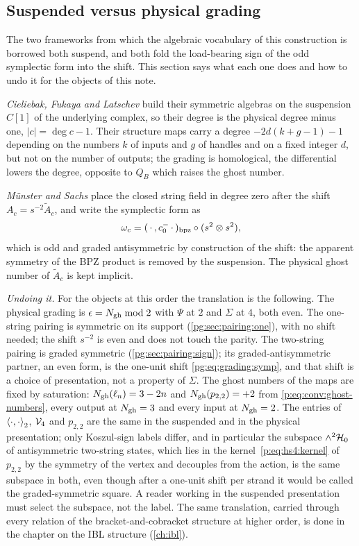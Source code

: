 \subsection{Suspended versus physical grading}
\label{pg:sec:suspension}

The two frameworks from which the algebraic vocabulary of this construction is borrowed both suspend, and both fold the load-bearing sign of the odd symplectic form into the shift.
This section says what each one does and how to undo it for the objects of this note.

\emph{Cieliebak, Fukaya and Latschev} \cite{Cieliebak:2015:HomologicalAlgebraRelated} build their symmetric algebras on the suspension $C[1]$ of the underlying complex, so their degree is the physical degree minus one, $|c|=\deg c-1$.
Their structure maps carry a degree $-2d(k+g-1)-1$ depending on the numbers $k$ of inputs and $g$ of handles and on a fixed integer $d$, but not on the number of outputs; the grading is homological, the differential lowers the degree, opposite to $Q_B$ which raises the ghost number.

\emph{Münster and Sachs} \cite{Muenster:2012:HomotopyAlgebrasString-kn,Muenster:2013:HomotopyAlgebrasQuantum} place the closed string field in degree zero after the shift $A_c=s^{-2}\tilde A_c$, and write the symplectic form as
\begin{equation}
  \omega_c
    = (\,\cdot\,, c_0^- \,\cdot\,)_{\rm bpz} \circ (s^2 \otimes s^2),
\end{equation}
which is odd and graded antisymmetric by construction of the shift: the apparent symmetry of the BPZ product is removed by the suspension.
The physical ghost number of $\tilde A_c$ is kept implicit.

\emph{Undoing it.}
For the objects at this order the translation is the following.
The physical grading is $\epsilon=N_{\rm gh}\bmod2$ with $\Psi$ at $2$ and $\Sigma$ at $4$, both even.
The one-string pairing is symmetric on its support (\cref{pg:sec:pairing:one}), with no shift needed; the shift $s^{-2}$ is even and does not touch the parity.
The two-string pairing is graded symmetric (\cref{pg:sec:pairing:sign}); its graded-antisymmetric partner, an even form, is the one-unit shift \eqref{pg:eq:grading:symp}, and that shift is a choice of presentation, not a property of $\Sigma$.
The ghost numbers of the maps are fixed by saturation: $N_{\rm gh}(\ell_n)=3-2n$ and $N_{\rm gh}(p_{2,2})=+2$ from \eqref{p:eq:conv:ghost-numbers}, every output at $N_{\rm gh}=3$ and every input at $N_{\rm gh}=2$.
The entries of $\braket{\cdot,\cdot}_2$, ${\mathcal{V}}_4$ and $p_{2,2}$ are the same in the suspended and in the physical presentation; only Koszul-sign labels differ, and in particular the subspace $\wedge^2{\mathcal{H}}_0$ of antisymmetric two-string states, which lies in the kernel~\eqref{p:eq:hs4:kernel} of $p_{2,2}$ by the symmetry of the vertex and decouples from the action, is the same subspace in both, even though after a one-unit shift per strand it would be called the graded-symmetric square.
A reader working in the suspended presentation must select the subspace, not the label.
The same translation, carried through every relation of the bracket-and-cobracket structure at higher order, is done in the chapter on the IBL structure (\cref{ch:ibl}).

